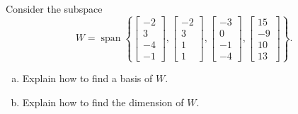 
\begin{exerciseStatement}


Consider the subspace \[W=\operatorname{span}  \left\{ \left[\begin{array}{c}
-2 \\
3 \\
-4 \\
-1
\end{array}\right] , \left[\begin{array}{c}
-2 \\
3 \\
1 \\
1
\end{array}\right] , \left[\begin{array}{c}
-3 \\
0 \\
-1 \\
-4
\end{array}\right] , \left[\begin{array}{c}
15 \\
-9 \\
10 \\
13
\end{array}\right] \right\} .\]


\begin{enumerate}[(a)]
\item  Explain how to find a basis of \(W\).
\item  Explain how to find the dimension of \(W\).
\end{enumerate}
    
\end{exerciseStatement}
    
